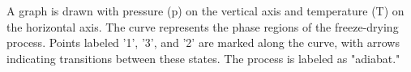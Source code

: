 A graph is drawn with pressure (p) on the vertical axis and temperature (T) on the horizontal axis. The curve represents the phase regions of the freeze-drying process. Points labeled '1', '3', and '2' are marked along the curve, with arrows indicating transitions between these states. The process is labeled as "adiabat."